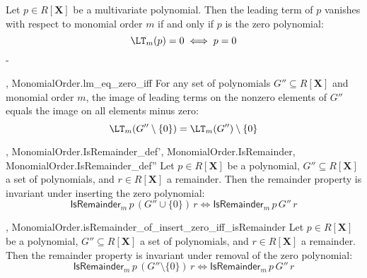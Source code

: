 \begin{lemma}\label{MonomialOrder.lm_eq_zero_iff}
  \leanok
  Let $p \in R[\mathbf{X}]$ be a multivariate polynomial. Then the leading term of $p$
vanishes with respect to monomial order $m$ if and only if $p$ is the zero polynomial:
\[
\LT_m(p) = 0 \iff p = 0
\]
-
\end{lemma}

\begin{lemma}\label{MonomialOrder.leadingTerm_image_sdiff_singleton_zero}
  \leanok
  ,
{MonomialOrder.lm_eq_zero_iff}
  For any set of polynomials $G'' \subseteq R[\mathbf{X}]$ and monomial order $m$,
the image of leading terms on the nonzero elements of $G''$ equals the image on all
elements minus zero:
\[
\LT_m(G'' \setminus \{0\}) = \LT_m(G'') \setminus \{0\}
\]

\end{lemma}

\begin{lemma}\label{MonomialOrder.isRemainder_of_insert_zero_iff_isRemainder}
  \leanok
  ,
{MonomialOrder.IsRemainder_def'},
{MonomialOrder.IsRemainder},
{MonomialOrder.IsRemainder_def''}
  Let $p \in R[\mathbf{X}]$ be a polynomial, $G'' \subseteq R[\mathbf{X}]$ a set of polynomials,
and $r \in R[\mathbf{X}]$ a remainder. Then the remainder property is invariant under
inserting the zero polynomial:
\[
\mathsf{IsRemainder}_m\,p\,(G'' \cup \{0\})\,r \iff \mathsf{IsRemainder}_m\,p\,G''\,r
\]

\end{lemma}

\begin{lemma}\label{MonomialOrder.isRemainder_of_singleton_zero_iff_isRemainder}
  \leanok
  ,
{MonomialOrder.isRemainder_of_insert_zero_iff_isRemainder}
  Let $p \in R[\mathbf{X}]$ be a polynomial, $G'' \subseteq R[\mathbf{X}]$ a set of polynomials,
and $r \in R[\mathbf{X}]$ a remainder. Then the remainder property is invariant under
removal of the zero polynomial:
\[
\mathsf{IsRemainder}_m\,p\,(G'' \setminus \{0\})\,r \iff \mathsf{IsRemainder}_m\,p\,G''\,r
\]

\end{lemma}

